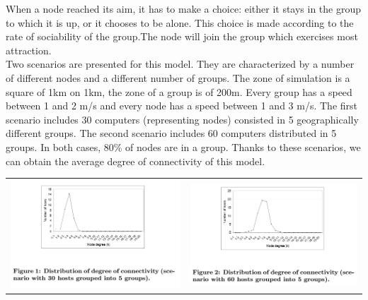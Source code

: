 When a node reached its aim, it has to make a choice:
either it stays in the group to which it is up, or
it chooses to be alone.
This choice is made according to the rate of sociability of the group.The node will join the group which exercises most attraction.\\

Two scenarios are presented for this model. They are characterized by a number of different nodes and a different number of groups.  The zone of simulation is a square of 1km on 1km, the zone of a group is of 200m. Every group has a speed between 1 and 2 m/s and every node has a speed between 1 and 3 m/s. The first scenario includes 30 computers (representing nodes) consisted in 5 geographically different groups. The second scenario includes 60 computers distributed in 5 groups. In both cases, 80\% of nodes are in a group. Thanks to these scenarios, we can obtain the average degree of connectivity of this model.\\

\begin{tabular}{cc}
   \includegraphics[scale=0.7]{../images/degreeConnectivitySocialNetwork30Nodes.png} &
   \includegraphics[scale=0.6]{../images/degreeConnectivitySocialNetwork60Nodes.png} \\
\end{tabular}

